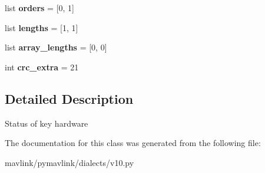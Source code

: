 \begin{DoxyCompactItemize}
list {\bfseries orders} = \mbox{[}0, 1\mbox{]}
\item 
\mbox{\label{classpymavlink_1_1dialects_1_1v10_1_1MAVLink__hwstatus__message_a8853e367b4cfa19d869e8a11d59c8f5a}} 
list {\bfseries lengths} = \mbox{[}1, 1\mbox{]}
\item 
\mbox{\label{classpymavlink_1_1dialects_1_1v10_1_1MAVLink__hwstatus__message_a6c77cf0958649923b21c9566ec79fe4c}} 
list {\bfseries array\+\_\+lengths} = \mbox{[}0, 0\mbox{]}
\item 
\mbox{\label{classpymavlink_1_1dialects_1_1v10_1_1MAVLink__hwstatus__message_acf755c078bb6c72bac933ef211d27039}} 
int {\bfseries crc\+\_\+extra} = 21
\end{DoxyCompactItemize}


\subsection{Detailed Description}
\begin{DoxyVerb}Status of key hardware
\end{DoxyVerb}
 

The documentation for this class was generated from the following file\+:\begin{DoxyCompactItemize}
\item 
mavlink/pymavlink/dialects/v10.\+py\end{DoxyCompactItemize}
